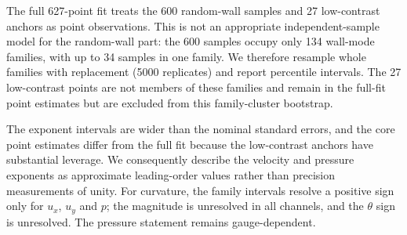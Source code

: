 \documentclass[preprint,11pt,a4paper,times]{elsarticle}
\begin{document}
The full 627-point fit treats the 600 random-wall samples and 27 low-contrast anchors as
point observations. This is not an appropriate independent-sample model for the random-wall
part: the 600 samples occupy only 134 wall-mode families, with up to 34 samples in one family.
We therefore resample whole families with replacement (5000 replicates) and report percentile
intervals. The 27 low-contrast points are not members of these families and remain in the
full-fit point estimates but are excluded from this family-cluster bootstrap.

\begin{table}[htbp]
\centering
\small
\caption{Family-clustered uncertainty on the 600-point random-wall core. The nominal column is
the 627-point fit reported in Table~\ref{tab:law}; the clustered columns are fits to the
600-point core and 95\% family-bootstrap intervals, not confidence intervals centered on the
full 627-point estimate. The quadratic is $R=a\varepsilon+c\varepsilon^2+b$ and
$\kappa=c/a$.}
\label{tab:cluster}
\end{table}

The exponent intervals are wider than the nominal standard errors, and the core point
estimates differ from the full fit because the low-contrast anchors have substantial leverage.
We consequently describe the velocity and pressure exponents as approximate leading-order
values rather than precision measurements of unity. For curvature, the family intervals
resolve a positive sign only for $u_x$, $u_y$ and $p$; the magnitude is unresolved in all
channels, and the $\theta$ sign is unresolved. The pressure statement remains gauge-dependent.
\end{document}
